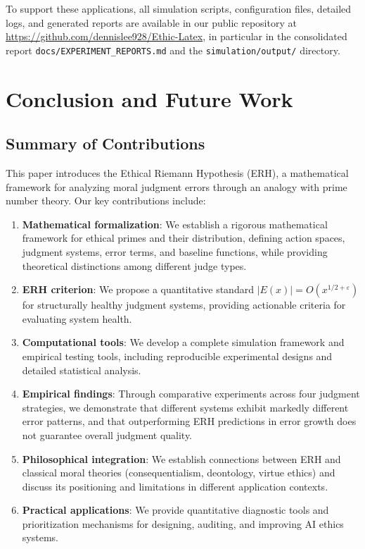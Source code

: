 \documentclass[12pt,a4paper]{article}
\theoremstyle{definition}
\theoremstyle{remark}
\begin{document}
To support these applications, all simulation scripts, configuration files, detailed logs, and generated reports are available in our public repository at \url{https://github.com/dennislee928/Ethic-Latex}, in particular in the consolidated report \texttt{docs/EXPERIMENT\_REPORTS.md} and the \texttt{simulation/output/} directory.

\section{Conclusion and Future Work}
\label{sec:conclusion}

\subsection{Summary of Contributions}

This paper introduces the Ethical Riemann Hypothesis (ERH), a mathematical framework for analyzing moral judgment errors through an analogy with prime number theory. Our key contributions include:

\begin{enumerate}
    \item \textbf{Mathematical formalization}: We establish a rigorous mathematical framework for ethical primes and their distribution, defining action spaces, judgment systems, error terms, and baseline functions, while providing theoretical distinctions among different judge types.
    \item \textbf{ERH criterion}: We propose a quantitative standard $|E(x)| = O(x^{1/2+\varepsilon})$ for structurally healthy judgment systems, providing actionable criteria for evaluating system health.
    \item \textbf{Computational tools}: We develop a complete simulation framework and empirical testing tools, including reproducible experimental designs and detailed statistical analysis.
    \item \textbf{Empirical findings}: Through comparative experiments across four judgment strategies, we demonstrate that different systems exhibit markedly different error patterns, and that outperforming ERH predictions in error growth does not guarantee overall judgment quality.
    \item \textbf{Philosophical integration}: We establish connections between ERH and classical moral theories (consequentialism, deontology, virtue ethics) and discuss its positioning and limitations in different application contexts.
    \item \textbf{Practical applications}: We provide quantitative diagnostic tools and prioritization mechanisms for designing, auditing, and improving AI ethics systems.
\end{enumerate}
\end{document}
